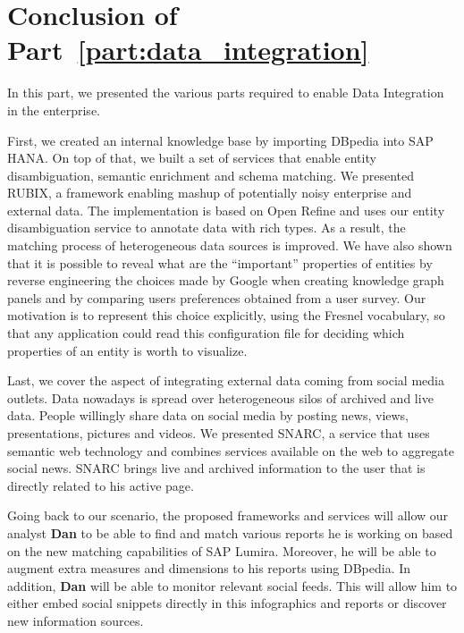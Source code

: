 \chapter*{Conclusion of Part~\ref{part:data_integration}}

In this part, we presented the various parts required to enable Data Integration in the enterprise.

First, we created an internal knowledge base by importing DBpedia into SAP HANA. On top of that, we built a set of services that enable entity disambiguation, semantic enrichment and schema matching. We presented RUBIX, a framework enabling mashup of potentially noisy enterprise and external data. The implementation is based on Open Refine and uses our entity disambiguation service to annotate data with rich types. As a result, the matching process of heterogeneous data sources is improved. We have also shown that it is possible to reveal what are the ``important'' properties of entities by reverse engineering the choices made by Google when creating knowledge graph panels and by comparing  users preferences obtained from a user survey. Our motivation is to represent this choice explicitly, using the Fresnel vocabulary, so that any application could read this configuration file for deciding which properties of an entity is worth to visualize.

Last, we cover the aspect of integrating external data coming from social media outlets. Data nowadays is spread over heterogeneous silos of archived and live data. People willingly share data on social media by posting news, views, presentations, pictures and videos. We presented SNARC, a service that uses semantic web technology and combines services available on the web to aggregate social news. SNARC brings live and archived information to the user that is directly related to his active page.

Going back to our scenario, the proposed frameworks and services will allow our analyst \textbf{Dan} to be able to find and match various reports he is working on based on the new matching capabilities of SAP Lumira. Moreover, he will be able to augment extra measures and dimensions to his reports using DBpedia. In addition, \textbf{Dan} will be able to monitor relevant social feeds. This will allow him to either embed social snippets directly in this infographics and reports or discover new information sources.